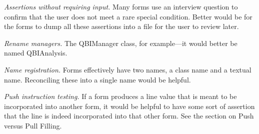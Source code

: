 \emph{Assertions without requiring input.} Many forms use an interview question
to confirm that the user does not meet a rare special condition. Better would be
for the forms to dump all these assertions into a file for the user to review
later.

\emph{Rename managers.} The QBIManager class, for example---it would better be
named QBIAnalysis.

\emph{Name registration.} Forms effectively have two names, a class name and a
textual name. Reconciling these into a single name would be helpful.

\emph{Push instruction testing.} If a form produces a line value that is meant
to be incorporated into another form, it would be helpful to have some sort of
assertion that the line is indeed incorporated into that other form. See the
section on Push versus Pull Filling.
